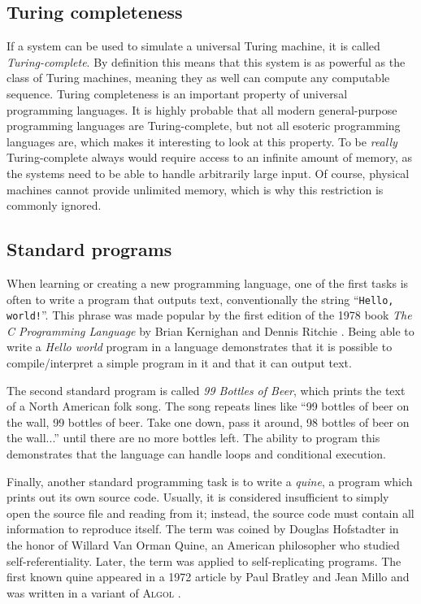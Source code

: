 \documentclass{sig-alternate}
\begin{document}
\subsection{Turing completeness}

If a system can be used to simulate a universal Turing machine, it is called \emph{Turing-complete}. By definition this means that this system is as powerful as the class of Turing machines, meaning they as well can compute any computable sequence.
Turing completeness is an important property of universal programming languages. It is highly probable that all modern general-purpose programming languages are Turing-complete, but not all esoteric programming languages are, which makes it interesting to look at this property. To be \emph{really} Turing-complete always would require access to an infinite amount of memory, as the systems need to be able to handle arbitrarily large input. Of course, physical machines cannot provide unlimited memory, which is why this restriction is commonly ignored.

\subsection{Standard programs}

When learning or creating a new programming language, one of the first tasks is often to write a program that outputs text, conventionally the string “\texttt{Hello, world!}”. This phrase was made popular by the first edition of the 1978 book \emph{The C Programming Language} by Brian Kernighan and Dennis Ritchie \cite{kernighan1978c}. Being able to write a \emph{Hello world} program in a language demonstrates that it is possible to compile/interpret a simple program in it and that it can output text.

The second standard program is called \emph{99 Bottles of Beer}, which prints the text of a North American folk song. The song repeats lines like “99 bottles of beer on the wall, 99 bottles of beer. Take one down, pass it around, 98 bottles of beer on the wall...” until there are no more bottles left. The ability to program this demonstrates that the language can handle loops and conditional execution.

Finally, another standard programming task is to write a \emph{quine}, a program which prints out its own source code. Usually, it is considered insufficient to simply open the source file and reading from it; instead, the source code must contain all information to reproduce itself. The term was coined by Douglas Hofstadter \cite{hofstadter1979godel} in the honor of Willard Van Orman Quine, an American philosopher who studied self-referentiality. Later, the term was applied to self-replicating programs. The first known quine appeared in a 1972 article by Paul Bratley and Jean Millo and was written in a variant of \textsc{Algol} \cite{bratley1972computer}.
\end{document}
